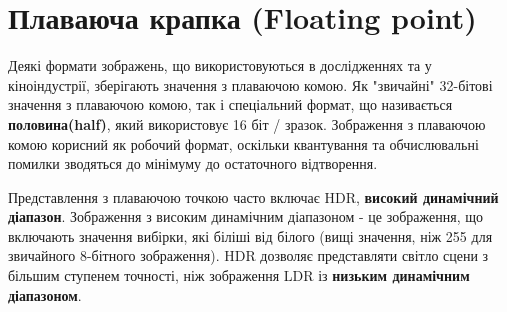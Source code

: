 \section{Плаваюча крапка (Floating point)}\label{sec:floating_point}
Деякі формати зображень, що використовуються в дослідженнях та у кіноіндустрії, зберігають значення з плаваючою комою.
Як "звичайні" 32-бітові значення з плаваючою комою, так і спеціальний формат, що називається \textbf{половина(half)}, який використовує 16 біт / зразок.
Зображення з плаваючою комою корисний як робочий формат, оскільки квантування та обчислювальні помилки зводяться до мінімуму до остаточного відтворення.

Представлення з плаваючою точкою часто включає HDR, \textbf{високий динамічний діапазон}.
Зображення з високим динамічним діапазоном - це зображення, що включають значення вибірки, які біліші від білого (вищі значення, ніж 255 для звичайного 8-бітного зображення).
HDR дозволяє представляти світло сцени з більшим ступенем точності, ніж зображення LDR із \textbf{низьким динамічним діапазоном}.

